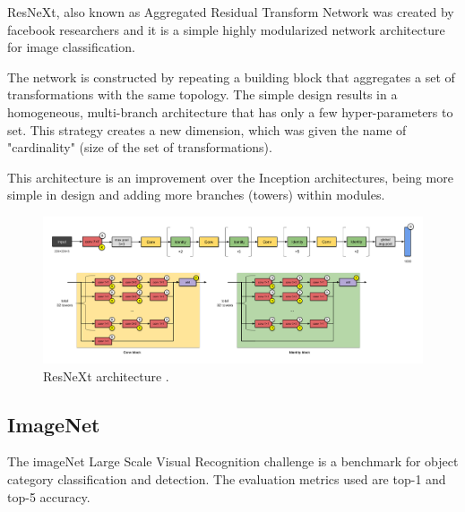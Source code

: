 \label{sec:resnext}
\par ResNeXt, also known as Aggregated Residual Transform Network was created by facebook researchers and it is a simple highly modularized network architecture for image classification. 
\par The network is constructed by repeating a building block that aggregates a set of transformations with the same topology. The simple design results in a homogeneous, multi-branch architecture that has only a few hyper-parameters to set. This strategy creates a new dimension, which was given the name of "cardinality" (size of the set of transformations). 
\par This architecture is an improvement over the Inception architectures, being more simple in design and adding more branches (towers) within modules. \cite{Xie2017}


\begin{figure}[htb]
    \centering
    \includegraphics[scale = 0.23]{Sections/2StateOfTheArt/2_images/resnext.png}
    \caption{ResNeXt architecture \cite{cnnarchitectures}. }
    \label{fig:noisestudent}
\end{figure}


\newpage

\subsection{ImageNet}
\par The imageNet Large Scale Visual Recognition challenge \cite{Russakovsky2015} is a benchmark for object category classification and detection. The evaluation metrics used are top-1 and top-5 accuracy.

